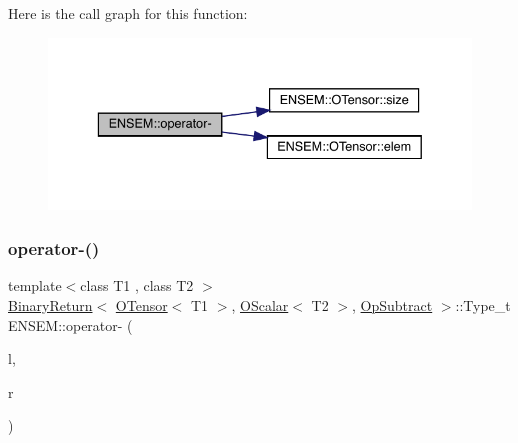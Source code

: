 Here is the call graph for this function\+:\nopagebreak
\begin{figure}[H]
\begin{center}
\leavevmode
\includegraphics[width=336pt]{de/d87/group__obstensor_gacbd7414e163d7986e5bcfb720e77b733_cgraph}
\end{center}
\end{figure}
\mbox{\label{group__obstensor_ga795d9d1bc036d1f9ddcab90e55085d67}} 
\subsubsection{\texorpdfstring{operator-\/()}{operator-()}\hspace{0.1cm}{\footnotesize\ttfamily [3/4]}}
{\footnotesize\ttfamily template$<$class T1 , class T2 $>$ \\
\mbox{\hyperlink{structENSEM_1_1BinaryReturn}{Binary\+Return}}$<$ \mbox{\hyperlink{classENSEM_1_1OTensor}{O\+Tensor}}$<$ T1 $>$, \mbox{\hyperlink{classENSEM_1_1OScalar}{O\+Scalar}}$<$ T2 $>$, \mbox{\hyperlink{structENSEM_1_1OpSubtract}{Op\+Subtract}} $>$\+::Type\+\_\+t E\+N\+S\+E\+M\+::operator-\/ (\begin{DoxyParamCaption}\item[{const \mbox{\hyperlink{classENSEM_1_1OTensor}{O\+Tensor}}$<$ T1 $>$ \&}]{l,  }\item[{const \mbox{\hyperlink{classENSEM_1_1OScalar}{O\+Scalar}}$<$ T2 $>$ \&}]{r }\end{DoxyParamCaption})\hspace{0.3cm}{\ttfamily [inline]}}

